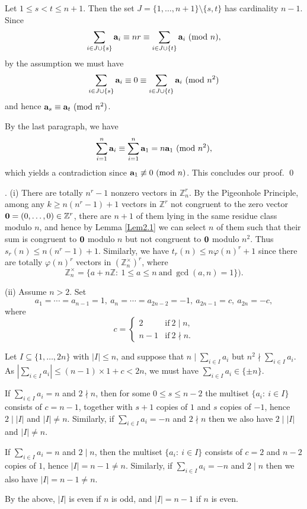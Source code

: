 \documentclass[11pt,reqno]{amsart}
\def\pmod #1{\ ({\rm{mod}}\ #1)}
\def\Z{\mathbb Z}
\def\t{\text}
\def\ls{\leqslant}
\def\gs{\geqslant}
\def\se {\subseteq}
\def\sm{\setminus}
\def\eq{\equiv}
\theoremstyle{plain}
\theoremstyle{definition}
\theoremstyle{remark}
\begin{document}
Let $1\ls s<t\ls n+1$. Then the set $J=\{1,\ldots,n+1\}\sm\{s,t\}$ has cardinality $n-1$.
Since
$$\sum_{i\in J\cup\{s\}}{\bf a}_i\eq nr\eq\sum_{i\in J\cup\{t\}}{\bf a}_i\pmod n,$$
by the assumption we must have
$$\sum_{i\in J\cup\{s\}}{\bf a}_i\eq0\eq\sum_{i\in J\cup\{t\}}{\bf a}_i\pmod{n^2}$$
and hence ${\bf a}_s\eq {\bf a}_t\pmod{n^2}$.

By the last paragraph,  we have
$$\sum_{i=1}^n {\bf a}_i\eq \sum_{i=1}^n {\bf a}_1=n{\bf a}_1\pmod {n^2},$$
which yields a contradiction since ${\bf a}_1\not\eq0\pmod n$.
This concludes our proof. \qed


\medskip
{}. (i) There are totally $n^r-1$
nonzero vectors in $\Z_n^r$. By the Pigeonhole Principle, among any $k\gs n(n^r-1)+1$
vectors in $\Z^r$ not congruent to the zero vector ${\bf 0}=(0,\ldots,0)\in\Z^r$,
there are $n+1$ of them lying in the same residue class modulo $n$, and hence by Lemma
\ref{Lem2.1} we can select $n$ of them such that their sum is congruent to ${\bf 0}$
modulo $n$ but not congruent to ${\bf 0}$ modulo $n^2$. Thus $s_r(n)\ls n(n^r-1)+1$.
Similarly, we have $t_r(n)\ls n\varphi(n)^r+1$ since there are totally $\varphi(n)^r$ vectors in $(\Z_n^\times)^r$, where
$$\Z_n^\times=\{a+n\Z:\ 1\ls a\ls n\ \t{and}\ \gcd(a,n)=1\}).$$

(ii) Assume $n>2$. Set
$$a_1=\cdots =a_{n-1}=1,\ a_n=\cdots =a_{2n-2}=-1,\ a_{2n-1}=c,\ a_{2n}=-c,$$
where
$$c=\begin{cases}2&\t{if}\ 2\mid n,\\n-1&\t{if}\ 2\nmid n.
\end{cases}
$$

Let $I\se\{1,\ldots,2n\}$ with $|I|\ls n$,  and suppose that $n\mid \sum_{i\in I}a_i$
but $n^2\nmid \sum_{i\in I}a_i$.
As $|\sum_{i\in I}a_i|\ls (n-1)\times 1+c<2n$, we must have $\sum_{i\in I}a_i\in\{\pm n\}$.

If $\sum_{i\in I}a_i=n$ and $2\nmid n$, then
for some $0\ls s\ls n-2$ the multiset $\{a_i:\ i\in I\}$ consists of $c=n-1$, together with $s+1$ copies of $1$ and
$s$ copies of $-1$, hence $2\mid |I|$ and $|I|\not=n$.
Similarly, if $\sum_{i\in I}a_i=-n$ and $2\nmid n$ then we also have $2\mid |I|$ and $|I|\not=n$.

If $\sum_{i\in I}a_i=n$ and $2\mid n$, then
 the multiset $\{a_i:\ i\in I\}$ consists of $c=2$ and $n-2$ copies of $1$, hence $|I|=n-1\not=n$.
Similarly, if $\sum_{i\in I}a_i=-n$ and $2\mid n$ then we also have $|I|=n-1\not=n$.

By the above, $|I|$ is even if $n$ is odd, and $|I|=n-1$ if $n$ is even.
\end{document}
